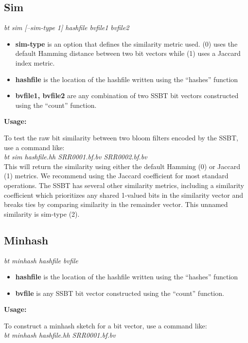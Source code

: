 \documentclass{article}
\begin{document}
\subsection{Sim}
\textit{bt sim [--sim-type 1] hashfile bvfile1 bvfile2}
\begin{itemize}
\item \textbf{sim-type} is an option that defines the similarity metric used. (0) uses the default Hamming distance between two bit vectors while (1) uses a Jaccard index metric.
\item \textbf{hashfile} is the location of the hashfile written using the ``hashes'' function
\item \textbf{bvfile1, bvfile2} are any combination of two SSBT bit vectors constructed using the ``count'' function.
\end{itemize}
\textbf{Usage:}

To test the raw bit similarity between two bloom filters encoded by the SSBT, use a command like: \\

\textit{bt sim hashfile.hh SRR0001.bf.bv SRR0002.bf.bv} \\

This will return the similarity using either the default Hamming (0) or Jaccard (1) metrics. We recommend using the Jaccard coefficient for most standard operations. The SSBT has several other similarity metrics, including a similarity coefficient which prioritizes any shared 1-valued bits in the similarity vector and breaks ties by comparing similarity in the remainder vector. This unnamed similarity is sim-type (2). 

\subsection{Minhash}
\textit{bt minhash hashfile bvfile}
\begin{itemize}
\item \textbf{hashfile} is the location of the hashfile written using the ``hashes'' function
\item \textbf{bvfile} is any SSBT bit vector constructed using the ``count'' function.
\end{itemize}
\textbf{Usage:}

To construct a minhash sketch for a bit vector, use a command like: \\

\textit{bt minhash hashfile.hh SRR0001.bf.bv} \\
\end{document}

